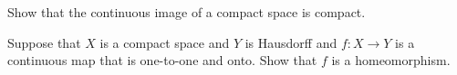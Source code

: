\begin{alist}
\item Show that the continuous image of a compact space is compact.
\item Suppose that $X$ is a compact space and $Y$ is Hausdorff and
$f:X\rightarrow Y$ is a continuous map that is one-to-one and
onto. Show that $f$ is a homeomorphism.
\end{alist}
